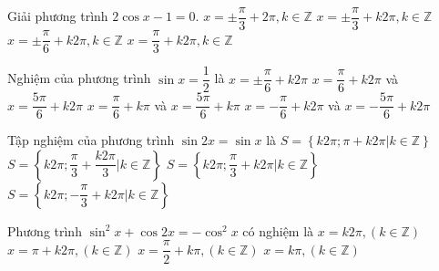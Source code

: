 \begin{ex}%
	Giải  phương trình $ 2\cos x-1=0 $.
	\choice 
		{$x=\pm  \dfrac{\pi}{3}+2\pi, k\in \mathbb{Z} $}
		{\True $x=\pm \dfrac{\pi}{3}+k2\pi, k\in \mathbb{Z} $} 
		{$x=\pm  \dfrac{\pi}{6}+k2\pi, k\in \mathbb{Z} $}
		{$x=  \dfrac{\pi}{3}+k2\pi, k\in \mathbb{Z} $}
\end{ex}

\begin{ex}%
	 Nghiệm của phương trình $\sin x=\dfrac{1}{2}$ là
	 \choice
		{$x=\pm \dfrac{\pi}{6}+k2\pi$} 
		{\True $x=\dfrac{\pi}{6}+k2\pi$  và $x=\dfrac{5\pi}{6}+k2\pi$}
		{$x=\dfrac{\pi}{6}+k\pi$ và $x=\dfrac{5\pi}{6}+k\pi$} 
		{$x=-\dfrac{\pi}{6}+k2\pi$ và $x=-\dfrac{5\pi}{6}+k2\pi$} 
\end{ex}

\begin{ex}%
	Tập nghiệm  của phương trình $\sin 2x=\sin x$ là
	 \choice
		{$S=\left\{k2\pi;\pi+k2\pi\left|k\in  \mathbb{Z}\right. \right\}$}
		{\True $S=\left\{k2\pi;\dfrac{\pi}{3}+\dfrac{k2\pi}{3}\left|k\in \mathbb{Z}\right. \right\}$} 
		{$S=\left\{k2\pi;\dfrac{\pi}{3}+k2\pi\left|k\in \mathbb{Z}\right. \right\}$} 
		{$S=\left\{k2\pi;-\dfrac{\pi}{3}+k2\pi\left|k\in \mathbb{Z}\right.  \right\}$}
	 \loigiai{
		Ta có $\sin 2x=\sin  x \Leftrightarrow \left[
		\begin{aligned}
			 &2x=x+k2\pi \\
			&2x=\pi-x+k2\pi 
		\end{aligned}\right. \Leftrightarrow \left[
		\begin{aligned}
			&x=k2\pi \\ 
			 &x=\dfrac{\pi}{3}+\dfrac{k2\pi}{3}
	\end{aligned}\right. \left(k\in \mathbb{Z}\right)$.}
\end{ex}

\begin{ex}%
	Phương trình $\sin^2  x+\cos 2x=-\cos^2 x$ có nghiệm là
	 \choice
		{$x=k2\pi, (k\in  \mathbb{Z})$}
		 {$x=\pi+k2\pi, (k\in \mathbb{Z})$}
		 {\True $x=\dfrac{\pi}{2}+k\pi, (k\in \mathbb{Z})$}
		 {$x=k\pi, (k\in \mathbb{Z})$}
\end{ex}

